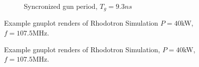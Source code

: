 \documentclass[a4paper,oneside,12pt]{report}
\numberwithin{equation}{chapter}
\begin{document}
{\begin{figure}[H]
\begin{subfigure}{0.9\textwidth}
        \caption*{Syncronized \e gun period, $T_g = 9.3ns$}
    \end{subfigure}
    \caption{Example gnuplot renders of Rhodotron Simulation $P=40$kW, $f=107.5$MHz.}
    \label{fig:example_gnuplot_renders}
\end{figure} \fi
\begin{figure}[H]
    \centering
    \vspace{15pt}
    \centering
    \vspace{15pt}
    \caption{Example gnuplot renders of Rhodotron Simulation, $P=40$kW, $f=107.5$MHz.} 
    \label{fig:example_gnuplot_renders}
\end{figure}

}
\end{document}
